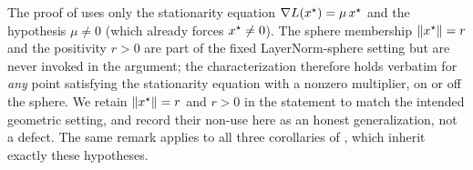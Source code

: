 \begin{remark}
\label{rem:generalization}
The proof of  uses only the stationarity equation
$\nabla L(x^{\star}) = \mu\,x^{\star}$ and the hypothesis $\mu \ne 0$ (which already forces
$x^{\star} \ne 0$). The sphere membership $\left\| x^{\star} \right\| = r$ and the positivity $r > 0$ are part
of the fixed LayerNorm-sphere setting but are never invoked in the argument; the
characterization therefore holds verbatim for \emph{any} point satisfying the stationarity
equation with a nonzero multiplier, on or off the sphere. We retain $\left\| x^{\star} \right\| = r$ and
$r > 0$ in the statement to match the intended geometric setting, and record their
non-use here as an honest generalization, not a defect. The same remark applies to all three
corollaries of , which inherit exactly these hypotheses.
\end{remark}
